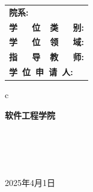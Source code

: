\vskip 1.0cm

\begin{center}
	\renewcommand\arraystretch{1.5}
	\begin{tabular}{l}
		{\sihao \bf 院\qquad\qquad 系:} \\
		{\sihao \bf 学~~~位~~类~~~别:}      \\
		{\sihao \bf 学~~~位~~领~~~域:}      \\
		{\sihao \bf 指~~~导~~教~~~师:}      \\
		{\sihao \bf 学~位~申~请~人:}
	\end{tabular}
	\begin{tabular}c

		{\sihao \bf  \qquad 软件工程学院 \qquad} \\
		                  \\
		                 \\
		\hline {\sihao \bf }                     \\
		\hline {\sihao \bf }                     \\


		\hline
	\end{tabular}
\end{center}

\vskip 2.0cm

\begin{center}
	{\sihao 2025年4月1日}
\end{center}

\cleardoublepage